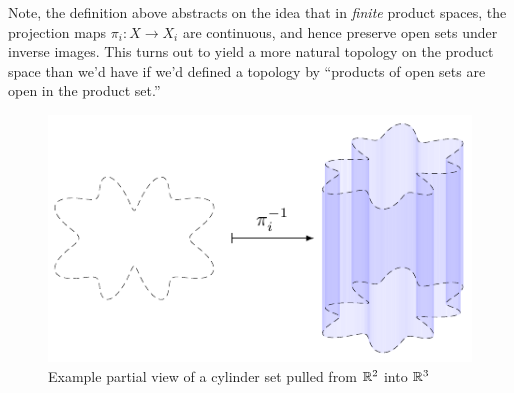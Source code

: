 \documentclass{fkpaper}
\begin{document}
\begin{multicols}{2}
Note, the definition above abstracts on the idea that in \emph{finite}
product spaces, the projection maps $\pi_i : X \to X_i$ are
continuous, and hence preserve open sets under inverse images. This
turns out to yield a more natural topology on the product space than
we'd have if we'd defined a topology by ``products of open sets are
open in the product set.''

\begin{figure}[H]
  \centering
  \includegraphics{figures/cylinder-set-pullback-example.pdf}
  \caption{Example partial view of a cylinder set pulled from $\mathbb{R}^2$
    into $\mathbb{R}^3$}
  \label{fig:cylinder-set}
\end{figure}


\end{multicols}
\end{document}
